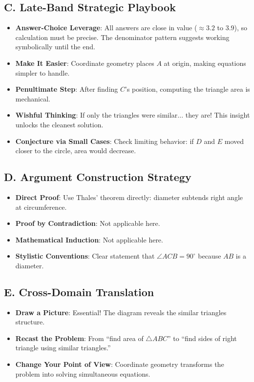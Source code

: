 \documentclass[]{article}
\begin{document}
\begin{strategicbox}
\subsection*{C. Late-Band Strategic Playbook}
\begin{itemize}[leftmargin=*]
    \item \textbf{Answer-Choice Leverage}: All answers are close in value ($\approx 3.2$ to $3.9$), so calculation must be precise. The denominator pattern suggests working symbolically until the end.
    \item \textbf{Make It Easier}: Coordinate geometry places $A$ at origin, making equations simpler to handle.
    \item \textbf{Penultimate Step}: After finding $C$'s position, computing the triangle area is mechanical.
    \item \textbf{Wishful Thinking}: If only the triangles were similar... they are! This insight unlocks the cleanest solution.
    \item \textbf{Conjecture via Small Cases}: Check limiting behavior: if $D$ and $E$ moved closer to the circle, area would decrease.
\end{itemize}

\subsection*{D. Argument Construction Strategy}
\begin{itemize}[leftmargin=*]
    \item \textbf{Direct Proof}: Use Thales' theorem directly: diameter subtends right angle at circumference.
    \item \textbf{Proof by Contradiction}: Not applicable here.
    \item \textbf{Mathematical Induction}: Not applicable here.
    \item \textbf{Stylistic Conventions}: Clear statement that $\angle ACB = 90^\circ$ because $AB$ is a diameter.
\end{itemize}

\subsection*{E. Cross-Domain Translation}
\begin{itemize}[leftmargin=*]
    \item \textbf{Draw a Picture}: Essential! The diagram reveals the similar triangles structure.
    \item \textbf{Recast the Problem}: From ``find area of $\triangle ABC$'' to ``find sides of right triangle using similar triangles.''
    \item \textbf{Change Your Point of View}: Coordinate geometry transforms the problem into solving simultaneous equations.
\end{itemize}
\end{strategicbox}
\end{document}
